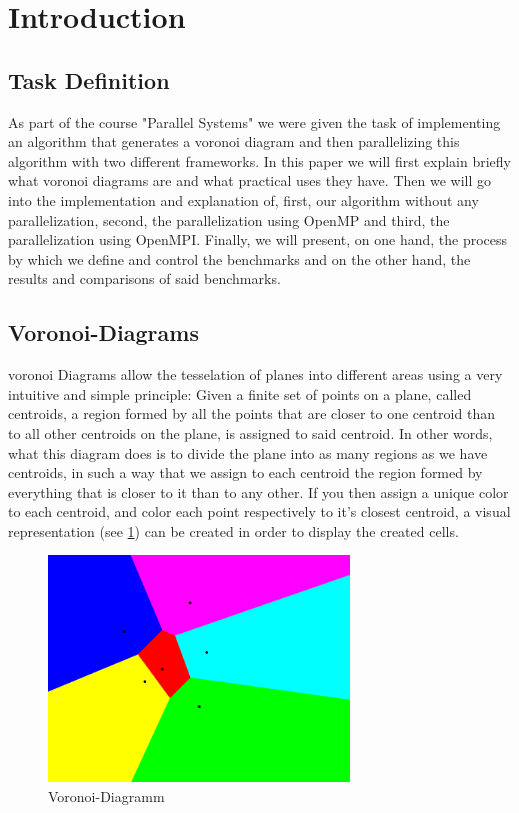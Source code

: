 \section{Introduction}

\subsection{Task Definition}
As part of the course "Parallel Systems" we were given the task of implementing an algorithm that generates a voronoi diagram and then parallelizing this algorithm with two different frameworks. In this paper we will first explain briefly what voronoi diagrams are and what practical uses they have. Then we will go into the implementation and explanation of, first, our algorithm without any parallelization, second, the parallelization using OpenMP and third, the parallelization using OpenMPI. Finally, we will present, on one hand, the process by which we define and control the benchmarks and on the other hand, the results and comparisons of said benchmarks.

\subsection{Voronoi-Diagrams}
voronoi Diagrams allow the tesselation of planes into different areas using a very intuitive and simple principle: Given a finite set of points on a plane, called centroids, a region formed by all the points that are closer to one centroid than to all other centroids on the plane, is assigned to said centroid. In other words, what this diagram does is to divide the plane into as many regions as we have centroids, in such a way that we assign to each centroid the region formed by everything that is closer to it than to any other. If you then assign a unique color to each centroid, and color each point respectively to it’s closest centroid, a visual representation (see \ref{fig:voronoi-diagram}) can be created in order to display the created cells.

\begin{center}
    \begin{figure}[H]
        \centering
            \includegraphics[width=8cm]{resources/images/introduction/voronoi.png}
            \caption{Voronoi-Diagramm}
            \label{fig:voronoi-diagram}
    \end{figure}
\end{center}

